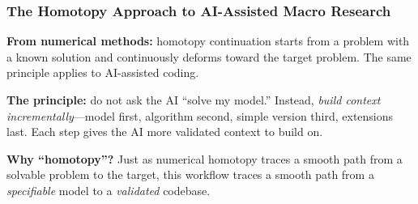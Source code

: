 \documentclass[10pt,english,aspectratio=169]{beamer}
\begin{document}
\begin{frame}
\frametitle{The Homotopy Approach to AI-Assisted Macro Research}

\textbf{From numerical methods:} homotopy continuation starts from a problem with a known solution and continuously deforms toward the target problem. The same principle applies to AI-assisted coding.

\vspace{0.3cm}

\begin{center}
\end{center}

\vspace{0.3cm}

\textbf{The principle:} do not ask the AI ``solve my model.'' Instead, \textit{build context incrementally}---model first, algorithm second, simple version third, extensions last. Each step gives the AI more validated context to build on.

\vspace{0.2cm}

\textbf{Why ``homotopy''?} Just as numerical homotopy traces a smooth path from a solvable problem to the target, this workflow traces a smooth path from a \textit{specifiable} model to a \textit{validated} codebase.
\end{frame}
\end{document}
